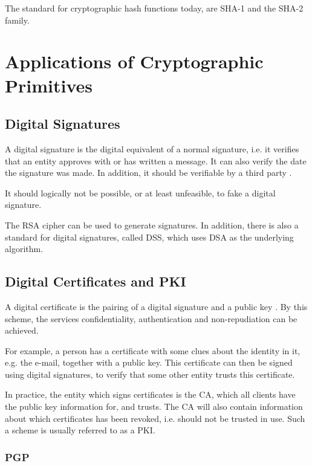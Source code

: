 \documentclass[pdftex,english,10pt,b5paper,twoside]{book}
\begin{document}
The standard for cryptographic hash functions today, are \ac{SHA}-1 and the
\ac{SHA}-2 family.

\section{Applications of Cryptographic Primitives}

\subsection{Digital Signatures}

A digital signature is the digital equivalent of a normal signature, i.e. it
verifies that an entity approves with or has written a message. It can also
verify the date the signature was made. In addition, it should be verifiable by
a third party \cite[p.  379]{stallings}.

It should logically not be possible, or at least unfeasible, to fake a digital
signature.

The \ac{RSA} cipher can be used to generate signatures. In addition, there is also a
standard for digital signatures, called \ac{DSS}, which uses \ac{DSA} as the
underlying algorithm.

\subsection{Digital Certificates and PKI}

A digital certificate is the pairing of a digital signature and a public key
\cite{stallings}. By this scheme, the services confidentiality, authentication
and non-repudiation can be achieved.

For example, a person has a certificate with some clues about the identity
in it, e.g. the e-mail, together with a public key. This certificate can then
be signed using digital signatures, to verify that some other entity trusts this
certificate.

In practice, the entity which signs certificates is the \ac{CA}, which all
clients have the public key information for, and trusts. The \ac{CA} will also
contain information about which certificates has been revoked, i.e. should not
be trusted in use. Such a scheme is usually referred to as a \ac{PKI}.

\subsubsection{PGP}
\end{document}
